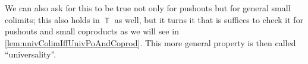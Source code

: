 
We can also ask for this to be true not only for pushouts but for general small colimits; 
this also  holds in $\Top$ as well, but it turns it that is suffices to check it for pushouts and small coproducts as we will see in \cref{lem:univColimIffUnivPoAndCoprod}.
This more general property is then called ``universality''.

